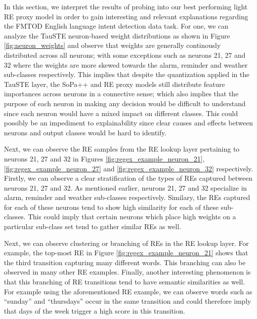 In this section, we interpret the results of probing into our best performing
light RE proxy model in order to gain interesting and relevant explanations
regarding the FMTOD English language intent detection data task. For one, we can
analyze the TauSTE neuron-based weight distributions as shown in Figure
\ref{fig:neuron_weights} and observe that weights are generally continously
distributed across all neurons; with some exceptions such as neurons 21, 27 and
32 where the weights are more skewed towards the alarm, reminder and weather
sub-classes respectively. This implies that despite the quantization applied in
the TauSTE layer, the SoPa++ and RE proxy models still distribute feature
importances across neurons in a connective sense; which also implies that the
purpose of each neuron in making any decision would be difficult to understand
since each neuron would have a mixed impact on different classes. This could
possibly be an impediment to explainability since clear causes and effects
between neurons and output classes would be hard to identify.

Next, we can observe the RE samples from the RE lookup layer pertaining to
neurons 21, 27 and 32 in Figures \ref{fig:regex_example_neuron_21},
\ref{fig:regex_example_neuron_27} and \ref{fig:regex_example_neuron_32}
respectively. Firstly, we can observe a clear stratification of the types of REs
captured between neurons 21, 27 and 32. As mentioned earlier, neurons 21, 27 and
32 specialize in alarm, reminder and weather sub-classes respectively. Similary,
the REs captured for each of these neurons tend to show high similarity for each
of these sub-classes. This could imply that certain neurons which place high
weights on a particular sub-class set tend to gather similar REs as well.

Next, we can observe clustering or branching of REs in the RE lookup layer. For
example, the top-most RE in Figure \ref{fig:regex_example_neuron_21} shows that
the third transition capturing many different words. This branching can also be
observed in many other RE examples. Finally, another interesting phenomenon is
that this branching of RE transitions tend to have semantic similarities as
well. For example using the aforementioned RE example, we can observe words such
as ``sunday'' and ``thursdays'' occur in the same transition and could therefore
imply that days of the week trigger a high score in this transition.


